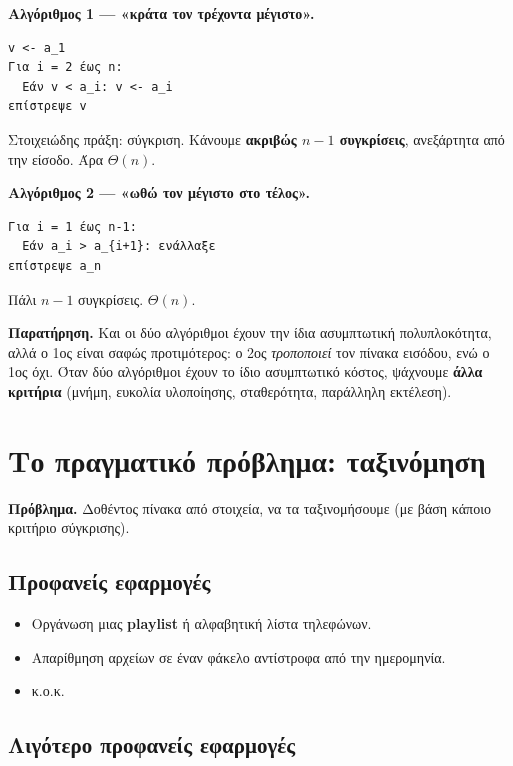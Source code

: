\documentclass[11pt,a4paper]{article}
\begin{document}
\begin{examplebox}
\textbf{Αλγόριθμος 1 --- «κράτα τον τρέχοντα μέγιστο».}
\begin{codebox}
\begin{verbatim}
v <- a_1
Για i = 2 έως n:
  Εάν v < a_i: v <- a_i
επίστρεψε v
\end{verbatim}
\end{codebox}
Στοιχειώδης πράξη: σύγκριση. Κάνουμε \textbf{ακριβώς $n-1$ συγκρίσεις},
ανεξάρτητα από την είσοδο. Άρα $\Theta(n)$.

\textbf{Αλγόριθμος 2 --- «ωθώ τον μέγιστο στο τέλος».}
\begin{codebox}
\begin{verbatim}
Για i = 1 έως n-1:
  Εάν a_i > a_{i+1}: ενάλλαξε
επίστρεψε a_n
\end{verbatim}
\end{codebox}
Πάλι $n-1$ συγκρίσεις. $\Theta(n)$.

\textbf{Παρατήρηση.} Και οι δύο αλγόριθμοι έχουν την ίδια ασυμπτωτική
πολυπλοκότητα, αλλά ο 1ος είναι σαφώς προτιμότερος: ο 2ος \textit{τροποποιεί} τον
πίνακα εισόδου, ενώ ο 1ος όχι. Όταν δύο αλγόριθμοι έχουν το ίδιο ασυμπτωτικό
κόστος, ψάχνουμε \textbf{άλλα κριτήρια} (μνήμη, ευκολία υλοποίησης, σταθερότητα,
παράλληλη εκτέλεση).
\end{examplebox}

\section{Το πραγματικό πρόβλημα: ταξινόμηση}

\begin{quoteblock}
\textbf{Πρόβλημα.} Δοθέντος πίνακα από στοιχεία, να τα ταξινομήσουμε (με βάση
κάποιο κριτήριο σύγκρισης).
\end{quoteblock}

\subsection{Προφανείς εφαρμογές}

\begin{itemize}
  \item Οργάνωση μιας \textbf{playlist} ή αλφαβητική λίστα τηλεφώνων.
  \item Απαρίθμηση αρχείων σε έναν φάκελο αντίστροφα από την ημερομηνία.
  \item κ.ο.κ.
\end{itemize}

\subsection{Λιγότερο προφανείς εφαρμογές}
\end{document}
